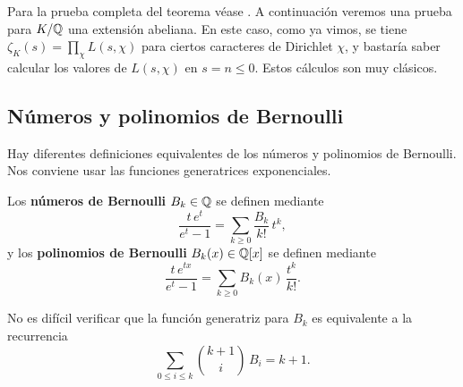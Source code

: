 Para la prueba completa del teorema véase \cite[\S VII.9]{Neukirch-ANT}.
A continuación veremos una prueba para $K/\mathbb{Q}$ una extensión abeliana. En este
caso, como ya vimos, se tiene $\zeta_K (s) = \prod_\chi L (s,\chi)$ para ciertos
caracteres de Dirichlet $\chi$, y bastaría saber calcular los valores de
$L (s,\chi)$ en $s = n \le 0$.  Estos cálculos son muy clásicos.

\subsection{Números y polinomios de Bernoulli}

Hay diferentes definiciones equivalentes de los números y polinomios de
Bernoulli. Nos conviene usar las funciones generatrices exponenciales.

\begin{definicion}
  Los \textbf{números de Bernoulli} $B_k \in \mathbb{Q}$ se definen mediante
  $$\frac{t\,e^t}{e^t - 1} = \sum_{k\ge 0} \frac{B_k}{k!}\,t^k,$$
  y los \textbf{polinomios de Bernoulli} $B_k (x) \in \mathbb{Q} [x]$ se definen
  mediante
  $$\frac{t\,e^{tx}}{e^t-1} = \sum_{k \ge 0} B_k (x)\,\frac{t^k}{k!}.$$
\end{definicion}

No es difícil verificar que la función generatriz para $B_k$ es equivalente a
la recurrencia
$$\sum_{0 \le i \le k} {k+1 \choose i}\,B_i = k+1.$$

